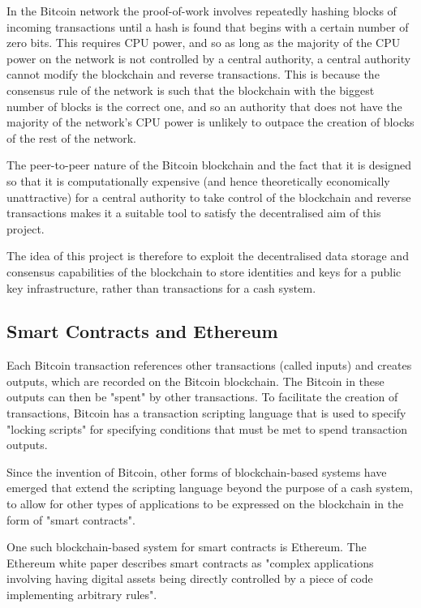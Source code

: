 \documentclass[12pt,a4paper]{report}
\begin{document}
	In the Bitcoin network the proof-of-work involves repeatedly hashing blocks of incoming transactions until a hash is found that begins with a certain number of zero bits. This requires CPU power, and so as long as the majority of the CPU power on the network is not controlled by a central authority, a central authority cannot modify the blockchain and reverse transactions. This is because the consensus rule of the network is such that the blockchain with the biggest number of blocks is the correct one, and so an authority that does not have the majority of the network's CPU power is unlikely to outpace the creation of blocks of the rest of the network.
	
	The peer-to-peer nature of the Bitcoin blockchain and the fact that it is designed so that it is computationally expensive (and hence theoretically economically unattractive) for a central authority to take control of the blockchain and reverse transactions makes it a suitable tool to satisfy the decentralised aim of this project.
	
	The idea of this project is therefore to exploit the decentralised data storage and consensus capabilities of the blockchain to store identities and keys for a public key infrastructure, rather than transactions for a cash system.
	
	\subsection{Smart Contracts and Ethereum}
	Each Bitcoin transaction references other transactions (called inputs) and creates outputs, which are recorded on the Bitcoin blockchain. The Bitcoin in these outputs can then be "spent" by other transactions. To facilitate the creation of transactions, Bitcoin has a transaction scripting language that is used to specify "locking scripts" for specifying conditions that must be met to spend transaction outputs.\cite{10}
	
	Since the invention of Bitcoin, other forms of blockchain-based systems have emerged that extend the scripting language beyond the purpose of a cash system, to allow for other types of applications to be expressed on the blockchain in the form of "smart contracts". 
	
	One such blockchain-based system for smart contracts is Ethereum. The Ethereum white paper describes smart contracts as "complex applications involving having digital assets being directly controlled by a piece of code implementing arbitrary rules".\cite{3}
	
\end{document}
